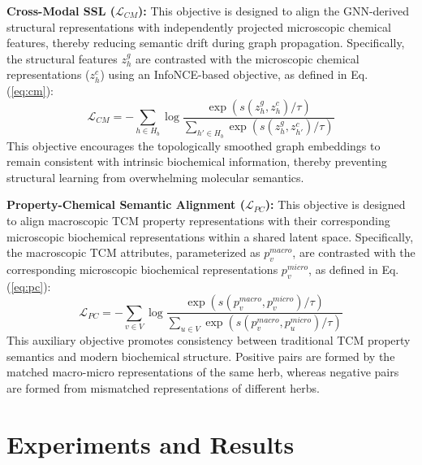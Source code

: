 \documentclass[a4paper,fleqn]{cas-dc}
\begin{document}
\textbf{Cross-Modal SSL ($\mathcal{L}_{CM}$):} This objective is designed to align the GNN-derived structural representations with independently projected microscopic chemical features, thereby reducing semantic drift during graph propagation. Specifically, the structural features $z_h^g$ are contrasted with the microscopic chemical representations ($z_h^c$) using an InfoNCE-based objective, as defined in Eq. (\ref{eq:cm}):
\begin{equation}
\label{eq:cm}
\mathcal{L}_{CM} = -\sum_{h \in H_b} \log \frac{\exp(s(z_h^g, z_h^c)/\tau)}{\sum_{h' \in H_b} \exp(s(z_h^g, z_{h'}^c)/\tau)}
\end{equation}
This objective encourages the topologically smoothed graph embeddings to remain consistent with intrinsic biochemical information, thereby preventing structural learning from overwhelming molecular semantics.

\textbf{Property-Chemical Semantic Alignment ($\mathcal{L}_{PC}$):} This objective is designed to align macroscopic TCM property representations with their corresponding microscopic biochemical representations within a shared latent space. Specifically, the macroscopic TCM attributes, parameterized as $p_v^{macro}$, are contrasted with the corresponding microscopic biochemical representations $p_v^{micro}$, as defined in Eq. (\ref{eq:pc}):
\begin{equation}
\label{eq:pc}
\mathcal{L}_{PC} = -\sum_{v \in V} \log \frac{\exp(s(p_v^{macro}, p_v^{micro})/\tau)}{\sum_{u \in V} \exp(s(p_v^{macro}, p_u^{micro})/\tau)}
\end{equation}
This auxiliary objective promotes consistency between traditional TCM property semantics and modern biochemical structure. Positive pairs are formed by the matched macro-micro representations of the same herb, whereas negative pairs are formed from mismatched representations of different herbs.

\section{Experiments and Results}\label{sec:experiments}
\end{document}
